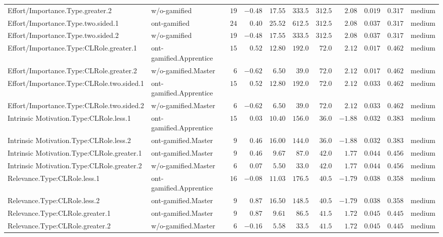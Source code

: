 \documentclass[6pt,a4paper]{article}
\begin{document}
\begin{landscape}
{\begin{longtable}{llrrrrrrrrl}
Effort/Importance.Type.greater.2&w/o-gamified&$19$&$-0.48$&$17.55$&$333.5$&$312.5$&$ 2.08$&$0.019$&$0.317$&medium\tabularnewline
Effort/Importance.Type.two.sided.1&ont-gamified&$24$&$ 0.40$&$25.52$&$612.5$&$312.5$&$ 2.08$&$0.037$&$0.317$&medium\tabularnewline
Effort/Importance.Type.two.sided.2&w/o-gamified&$19$&$-0.48$&$17.55$&$333.5$&$312.5$&$ 2.08$&$0.037$&$0.317$&medium\tabularnewline
Effort/Importance.Type:CLRole.greater.1&ont-gamified.Apprentice&$15$&$ 0.52$&$12.80$&$192.0$&$ 72.0$&$ 2.12$&$0.017$&$0.462$&medium\tabularnewline
Effort/Importance.Type:CLRole.greater.2&w/o-gamified.Master&$ 6$&$-0.62$&$ 6.50$&$ 39.0$&$ 72.0$&$ 2.12$&$0.017$&$0.462$&medium\tabularnewline
Effort/Importance.Type:CLRole.two.sided.1&ont-gamified.Apprentice&$15$&$ 0.52$&$12.80$&$192.0$&$ 72.0$&$ 2.12$&$0.033$&$0.462$&medium\tabularnewline
Effort/Importance.Type:CLRole.two.sided.2&w/o-gamified.Master&$ 6$&$-0.62$&$ 6.50$&$ 39.0$&$ 72.0$&$ 2.12$&$0.033$&$0.462$&medium\tabularnewline
Intrinsic Motivation.Type:CLRole.less.1&ont-gamified.Apprentice&$15$&$ 0.03$&$10.40$&$156.0$&$ 36.0$&$-1.88$&$0.032$&$0.383$&medium\tabularnewline
Intrinsic Motivation.Type:CLRole.less.2&ont-gamified.Master&$ 9$&$ 0.46$&$16.00$&$144.0$&$ 36.0$&$-1.88$&$0.032$&$0.383$&medium\tabularnewline
Intrinsic Motivation.Type:CLRole.greater.1&ont-gamified.Master&$ 9$&$ 0.46$&$ 9.67$&$ 87.0$&$ 42.0$&$ 1.77$&$0.044$&$0.456$&medium\tabularnewline
Intrinsic Motivation.Type:CLRole.greater.2&w/o-gamified.Master&$ 6$&$ 0.07$&$ 5.50$&$ 33.0$&$ 42.0$&$ 1.77$&$0.044$&$0.456$&medium\tabularnewline
Relevance.Type:CLRole.less.1&ont-gamified.Apprentice&$16$&$-0.08$&$11.03$&$176.5$&$ 40.5$&$-1.79$&$0.038$&$0.358$&medium\tabularnewline
Relevance.Type:CLRole.less.2&ont-gamified.Master&$ 9$&$ 0.87$&$16.50$&$148.5$&$ 40.5$&$-1.79$&$0.038$&$0.358$&medium\tabularnewline
Relevance.Type:CLRole.greater.1&ont-gamified.Master&$ 9$&$ 0.87$&$ 9.61$&$ 86.5$&$ 41.5$&$ 1.72$&$0.045$&$0.445$&medium\tabularnewline
Relevance.Type:CLRole.greater.2&w/o-gamified.Master&$ 6$&$-0.16$&$ 5.58$&$ 33.5$&$ 41.5$&$ 1.72$&$0.045$&$0.445$&medium\tabularnewline
\hline
\end{longtable}}

\end{landscape}
\end{document}

